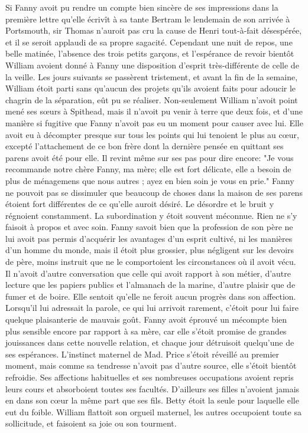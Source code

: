 Si Fanny avoit pu rendre un compte bien sincère de ses impressions dans la première lettre qu'elle écrivît à sa tante Bertram le lendemain de son arrivée à Portsmouth, sir Thomas n'auroit pas cru la cause de Henri tout-à-fait désespérée, et il se seroit applaudi de sa propre sagacité. Cependant une nuit de repos, une belle matinée, l'absence des trois petits garçons, et l'espérance de revoir bientôt William avoient donné à Fanny une\setcounter{page}{395} disposition d'esprit très-différente de celle de la veille.
Les jours suivants se passèrent tristement, et avant la fin de la semaine, William étoit parti sans qu'aucun des projets qu'ils avoient faits pour adoucir le chagrin de la séparation, eût pu se réaliser. Non-seulement William n'avoit point mené ses sœurs à Spithead, mais il n'avoit pu venir à terre que deux fois, et d'une manière si fugitive que Fanny n'avoit pas eu un moment pour causer avec lui. Elle avoit eu à décompter presque sur tous les points qui lui tenoient le plus au cœur, excepté l'attachement de ce bon frère dont la dernière pensée en quittant ses parens avoit été pour elle. Il revint même sur ses pas pour dire encore: "Je vous recommande notre chère Fanny, ma mère; elle est fort délicate, elle a besoin de plus de ménagemens que nous autres ; ayez en bien soin je vous en prie."
Fanny ne pouvoit pas se dissimuler que beaucoup de choses dans la maison de ses parens étoient fort différentes de ce qu'elle auroit désiré. Le désordre et le bruit y régnoient constamment. La subordination y étoit souvent méconnue. Rien ne s'y faisoit à propos et avec soin. Fanny savoit bien\setcounter{page}{396} que la profession de son père ne lui avoit pas permis d'acquérir les avantages d'un esprit cultivé, ni les manières d'un homme du monde, mais il étoit plus grossier, plus négligent sur les devoirs de père, moins instruit que ne le comportoient les circonstances où il avoit vécu. Il n'avoit d'autre conversation que celle qui avoit rapport à son métier, d'autre lecture que les papiers publics et l'almanach de la marine, d'autre plaisir que de fumer et de boire.
Elle sentoit qu'elle ne feroit aucun progrès dans son affection. Lorsqu'il lui adressait la parole, ce qui lui arrivoit rarement, c'étoit pour lui faire quelque plaisanterie de mauvais goût.
Fanny avoit éprouvé un mécompte bien plus sensible encore par rapport à sa mère, car elle s'étoit promise de grandes jouissances dans cette nouvelle relation, et chaque jour détruisoit quelqu'une de ses espérances. L'instinct maternel de Mad. Price s'étoit réveillé au premier moment, mais comme sa tendresse n'avoit pas d'autre source, elle s'étoit bientôt refroidie. Ses affections habituelles et ses nombreuses occupations avoient repris leurs cours et absorboient toutes ses facultés. D'ailleurs ses filles n'avoient jamais\setcounter{page}{397} en dans son cœur la même part que ses fils. Betty étoit la seule pour laquelle elle eut du foible. William flattoit son orgueil maternel, les autres occupoient toute sa sollicitude, et faisoient sa joie ou son tourment.
